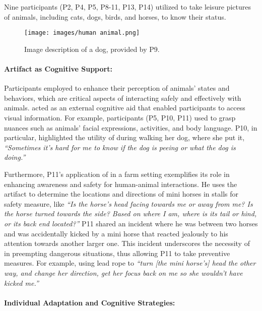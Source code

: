 Nine participants (P2, P4, P5, P8-11, P13, P14) utilized \bma{} to take leisure pictures of animals, including cats, dogs, birds, and horses, to know their status. 


\begin{figure}[t!]
\centering
\texttt{[image: images/human animal.png]}
\caption{Image description of a dog, provided by P9.}
\end{figure}

\paragraph{Artifact as Cognitive Support:}
Participants employed \bma{} to enhance their perception of animals' states and behaviors, which are critical aspects of interacting safely and effectively with animals. \bma{} acted as an external cognitive aid that enabled participants to access visual information. 
% 
For example, participants (P5, P10, P11) used \bma{} to grasp nuances such as animals’ facial expressions, activities, and body language. P10, in particular, highlighted the utility of \bma{} during walking her dog, where she put it, \textit{``Sometimes it's hard for me to know if the dog is peeing or what the dog is doing.''}


Furthermore, P11's application of \bma{} in a farm setting exemplifies its role in enhancing awareness and safety for human-animal interactions. He uses the artifact to determine the locations and directions of mini horses in stalls for safety measure, like \textit{``Is the horse's head facing towards me or away from me? Is the horse turned towards the side? Based on where I am, where is its tail or hind, or its back end located?''}
% 
P11 shared an incident where he was between two horses and was accidentally kicked by a mini horse that reacted jealously to his attention towards another larger one. 
% 
This incident underscores the necessity of \bma{} in preempting dangerous situations, thus allowing P11 to take preventive measures. For example, using lead rope to \textit{``turn [the mini horse's] head the other way, and change her direction, get her focus back on me so she wouldn't have kicked me.''}





\paragraph{Individual Adaptation and Cognitive Strategies:}


